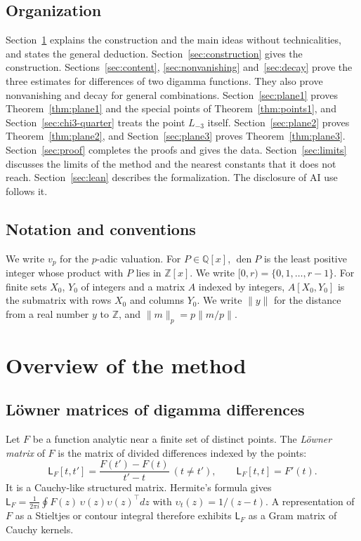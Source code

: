 \documentclass[11pt]{amsart}
\theoremstyle{definition}
\theoremstyle{remark}
\numberwithin{equation}{section}
\newcommand{\Z}{\mathbb Z}
\newcommand{\Q}{\mathbb Q}
\newcommand{\den}{\operatorname{den}}
\newcommand{\Lw}{\mathsf L}          %
\newcommand{\Lt}{L_{-3}}             %
\begin{document}
\subsection{Organization}
Section~\ref{sec:overview} explains the construction and the main ideas without technicalities, and states the general
deduction. Section~\ref{sec:construction} gives the construction. Sections~\ref{sec:content}, \ref{sec:nonvanishing}
and~\ref{sec:decay} prove the three estimates for differences of two digamma functions. They also prove nonvanishing and
decay for general combinations. Section~\ref{sec:plane1} proves Theorem~\ref{thm:plane1} and the special points of
Theorem~\ref{thm:points1}, and Section~\ref{sec:chi3-quarter} treats the point $\Lt$ itself. Section~\ref{sec:plane2}
proves Theorem~\ref{thm:plane2}, and Section~\ref{sec:plane3} proves Theorem~\ref{thm:plane3}. Section~\ref{sec:proof}
completes the proofs and gives the data.
Section~\ref{sec:limits} discusses the limits of the method and the nearest constants that it does not reach.
Section~\ref{sec:lean} describes the formalization. The
disclosure of AI use follows it.

\subsection{Notation and conventions}
We write $v_p$ for the $p$-adic valuation. For $P\in\Q[x]$, $\den P$ is the least positive integer whose product with
$P$ lies in $\Z[x]$. We write $[0,r)=\{0,1,\dots,r-1\}$.
For finite sets $X_0$, $Y_0$ of integers and a matrix $A$ indexed by integers, $A[X_0,Y_0]$ is the submatrix with rows
$X_0$ and columns $Y_0$. We write $\|y\|$ for the distance from a real number $y$ to $\Z$, and $\|m\|_p=p\|m/p\|$.
\section{Overview of the method}\label{sec:overview}

\subsection{L\"owner matrices of digamma differences}
Let $F$ be a function analytic near a finite set of distinct points. The \emph{L\"owner matrix} \cite{Loewner34} of $F$
is the matrix of divided differences indexed by the points:
\[
 \Lw_F[t,t']=\frac{F(t')-F(t)}{t'-t}\ (t\ne t'),\qquad \Lw_F[t,t]=F'(t).
\]
It is a Cauchy-like structured matrix. Hermite's formula gives
$\Lw_F=\frac1{2\pi i}\oint F(z)\,\upsilon(z)\upsilon(z)^{\top}dz$ with $\upsilon_t(z)=1/(z-t)$. A representation of $F$ as
a Stieltjes or contour integral therefore exhibits $\Lw_F$ as a Gram matrix of Cauchy kernels.
\end{document}
